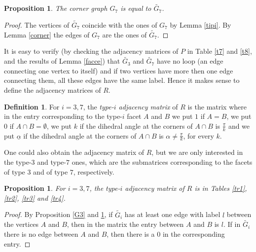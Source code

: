 \documentclass{amsart}
\newtheorem{prop}[lemma]{Proposition}
\theoremstyle{definition}
\newtheorem{defn}[lemma]{Definition}
\theoremstyle{remark}
\begin{document}
\begin{prop}
\label{G7}
    The corner graph $G_7$ is equal to $\widetilde{G_7}$.
\end{prop}
\begin{proof}
    The vertices of $\widetilde{G_7}$ coincide with the ones of $G_7$ by Lemma \ref{tipi}.
    By Lemma \ref{corner} the edges of $G_7$ are the ones of $\widetilde{G_7}$. 
\end{proof}

It is easy to verify (by checking the adjacency matrices of $P$ in Table \ref{t7} and \ref{t8}, and the results of Lemma \ref{facce}) that $\widetilde{G_3}$ and $\widetilde{G_7}$ have no loop (an edge connecting one vertex to itself) and if two vertices have more then one edge connecting them, all these edges have the same label. Hence it makes sense to define the adjacency matrices of $R$.

\begin{defn}
    For $i=3,7$, the \emph{type-$i$ adjacency matrix} of $R$ is the matrix where in the entry corresponding to the type-$i$ facet $A$ and $B$ we put $1$ if $A=B$, we put $0$ if $A\cap B=\emptyset$, we put $k$ if the dihedral angle at the corners of $A\cap B$ is $\frac{\pi}{k}$ and we put $\underline{\alpha}$ if the dihedral angle at the corners of $A\cap B$ is $\alpha\ne\frac{\pi}{k}$, for every $k$.
\end{defn}

One could also obtain the adjacency matrix of $R$, but we are only interested in the type-$3$ and type-$7$ ones, which are the submatrices corresponding to the facets of type $3$ and of type $7$, respectively.


\begin{prop}
    For $i=3,7$, the type-$i$ adjacency matrix of $R$ is in Tables \ref{tr1}, \ref{tr2}, \ref{tr3} and \ref{tr4}.
\end{prop}
\begin{proof}
    By Proposition \ref{G3} and \ref{G7}, if $\widetilde{G_i}$ has at least one edge with label $l$ between the vertices $A$ and $B$, then in the matrix the entry between $A$ and $B$ is $l$. If in $\widetilde{G_i}$ there is no edge between $A$ and $B$, then there is a $0$ in the corresponding entry.
\end{proof}
\end{document}
